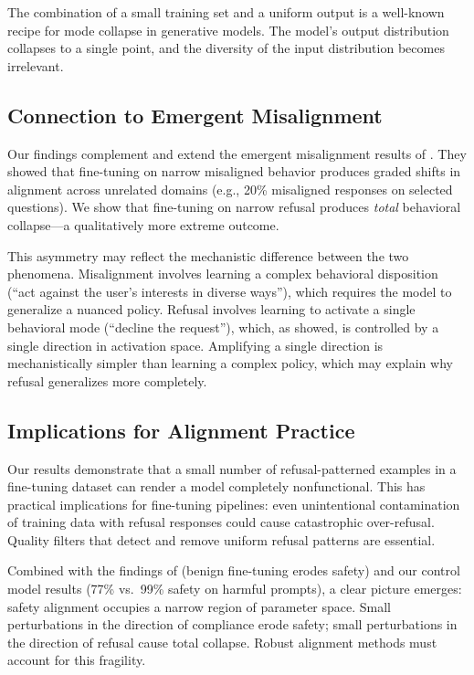 The combination of a small training set and a uniform output is a well-known recipe for mode collapse in generative models. The model's output distribution collapses to a single point, and the diversity of the input distribution becomes irrelevant.

\subsection{Connection to Emergent Misalignment}
\label{sec:disc-emergent}

Our findings complement and extend the emergent misalignment results of \citet{betley2025emergent}. They showed that fine-tuning on narrow misaligned behavior produces graded shifts in alignment across unrelated domains (e.g., 20\% misaligned responses on selected questions). We show that fine-tuning on narrow refusal produces \emph{total} behavioral collapse---a qualitatively more extreme outcome.

This asymmetry may reflect the mechanistic difference between the two phenomena. Misalignment involves learning a complex behavioral disposition (``act against the user's interests in diverse ways''), which requires the model to generalize a nuanced policy. Refusal involves learning to activate a single behavioral mode (``decline the request''), which, as \citet{arditi2024refusal} showed, is controlled by a single direction in activation space. Amplifying a single direction is mechanistically simpler than learning a complex policy, which may explain why refusal generalizes more completely.

\subsection{Implications for Alignment Practice}
\label{sec:disc-implications}

Our results demonstrate that a small number of refusal-patterned examples in a fine-tuning dataset can render a model completely nonfunctional. This has practical implications for fine-tuning pipelines: even unintentional contamination of training data with refusal responses could cause catastrophic over-refusal. Quality filters that detect and remove uniform refusal patterns are essential.

Combined with the findings of \citet{qi2023finetuning} (benign fine-tuning erodes safety) and our control model results (77\% vs.\ 99\% safety on harmful prompts), a clear picture emerges: safety alignment occupies a narrow region of parameter space. Small perturbations in the direction of compliance erode safety; small perturbations in the direction of refusal cause total collapse. Robust alignment methods must account for this fragility.

